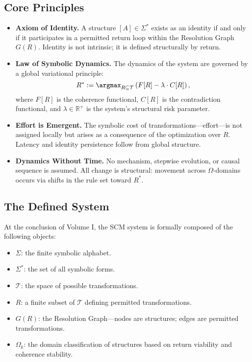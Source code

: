 \subsection*{Core Principles}

\begin{itemize}
    \item \textbf{Axiom of Identity.} A structure $[A] \in \Sigma^*$ exists as an identity if and only if it participates in a permitted return loop within the Resolution Graph $G(R)$. Identity is not intrinsic; it is defined structurally by return.

    \item \textbf{Law of Symbolic Dynamics.} The dynamics of the system are governed by a global variational principle:
    \[
    R^* := \argmax_{R \subseteq \mathcal{T}} \left( F[R] - \lambda \cdot C[R] \right),
    \]
    where $F[R]$ is the coherence functional, $C[R]$ is the contradiction functional, and $\lambda \in \mathbb{R}^+$ is the system’s structural risk parameter.

    \item \textbf{Effort is Emergent.} The symbolic cost of transformations—effort—is not assigned locally but arises as a consequence of the optimization over $R$. Latency and identity persistence follow from global structure.

    \item \textbf{Dynamics Without Time.} No mechanism, stepwise evolution, or causal sequence is assumed. All change is structural: movement across $\Omega$-domains occurs via shifts in the rule set toward $R^*$.

\end{itemize}

\subsection*{The Defined System}

At the conclusion of Volume I, the SCM system is formally composed of the following objects:

\begin{itemize}
    \item $\Sigma$: the finite symbolic alphabet.
    \item $\Sigma^*$: the set of all symbolic forms.
    \item $\mathcal{T}$: the space of possible transformations.
    \item $R$: a finite subset of $\mathcal{T}$ defining permitted transformations.
    \item $G(R)$: the Resolution Graph—nodes are structures; edges are permitted transformations.
    \item $\Omega_k$: the domain classification of structures based on return viability and coherence stability.
\end{itemize}

